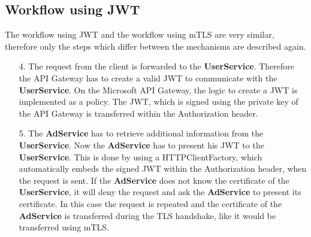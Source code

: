 \subsection{Workflow using JWT}
The workflow using JWT and the workflow using mTLS are very similar, therefore only the steps which differ between the mechanisms are described again.
\begin{enumerate}
	\item[4.] The request from the client is forwarded to the \textbf{UserService}. 
		Therefore the API Gateway has to create a valid JWT to communicate with the \textbf{UserService}.
		On the Microsoft API Gateway, the logic to create a JWT is implemented as a policy.
		The JWT, which is signed using the private key of the API Gateway is transferred within the Authorization header.
	\item[5.] The \textbf{AdService} has to retrieve additional information from the \textbf{UserService}.
		Now the \textbf{AdService} has to present his JWT to the \textbf{UserService}.
		This is done by using a HTTPClientFactory, which automatically embeds the signed JWT within the Authorization header, when the request is sent.
		If the \textbf{AdService} does not know the certificate of the \textbf{UserService}, it will deny the request and ask the \textbf{AdService} to present its certificate.
		In this case the request is repeated and the certificate of the \textbf{AdService} is transferred during the TLS handshake, like it would be transferred using mTLS.
\end{enumerate}

